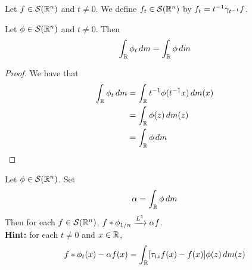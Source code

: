 \documentclass{book}
\begin{document}
	\begin{defn}
		Let $f \in \mathcal{S}(\mathbb{R}^n)$ and $t \neq 0$. We define $f_t \in \mathcal{S}(\mathbb{R}^n)$ by $f_t = t^{-1} \gamma_{t^{-1}} f$.   
	\end{defn}

	\begin{ex}
		Let $\phi \in \mathcal{S}(\mathbb{R}^n)$ and $t \neq 0$. Then 
		$$\int_{\mathbb{R}}\phi_t \, d m = \int_{\mathbb{R}} \phi \, d m$$  
	\end{ex}

	\begin{proof}
		We have that 
		\begin{align*}
			\int_{\mathbb{R}}\phi_t \, d m 
			& = \int_{\mathbb{R}}t^{-1}\phi(t^{-1}x) \, d m(x) \\
			& = \int_{\mathbb{R}} \phi(z) \, d m(z) \\
			& = \int_{\mathbb{R}}\phi \, d m 
		\end{align*}
	\end{proof}

	\begin{ex}
		Let $\phi \in \mathcal{S}(\mathbb{R}^n)$. Set 
		$$\alpha = \int_{\mathbb{R}} \phi \, d m$$ 
		Then for each $f \in \mathcal{S}(\mathbb{R}^n)$,  $f * \phi_{1/n} \xrightarrow{L^1} \alpha f$. \\
		\textbf{Hint:} for each $t \neq 0$ and $x \in \mathbb{R}$, 
		$$f * \phi_t(x) - \alpha f(x) = \int_{\mathbb{R}} [\tau_{tz}f(x)  -  f(x)] \phi(z) \, d m(z) $$
	\end{ex}
\end{document}

